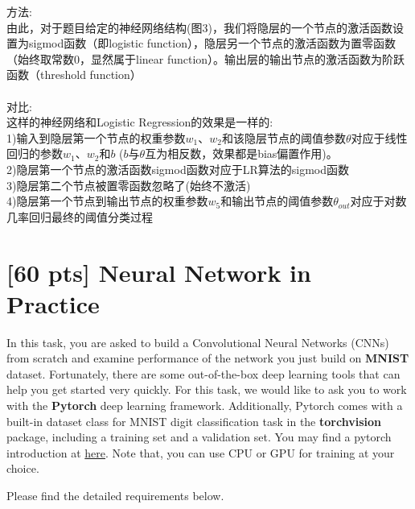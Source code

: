 \documentclass{article}
\begin{document}
	方法:\\由此，对于题目给定的神经网络结构(图3)，我们将隐层的一个节点的激活函数设置为sigmod函数（即logistic function），隐层另一个节点的激活函数为置零函数（始终取常数0，显然属于linear function）。输出层的输出节点的激活函数为阶跃函数（threshold function）\\\\
	对比:\\这样的神经网络和Logistic Regression的效果是一样的:\\
	1)输入到隐层第一个节点的权重参数$w_1$、$w_2$和该隐层节点的阈值参数$\theta$对应于线性回归的参数$w_1$、$w_2$和$b$ ($b$与$\theta$互为相反数，效果都是bias偏置作用)。\\
	2)隐层第一个节点的激活函数sigmod函数对应于LR算法的sigmod函数\\
	3)隐层第二个节点被置零函数忽略了(始终不激活)\\
	4)隐层第一个节点到输出节点的权重参数$w_5$和输出节点的阈值参数$\theta_{out}$对应于对数几率回归最终的阈值分类过程
	\\
	\section{[60 pts] Neural Network in Practice}
	
	In this task, you are asked to build a Convolutional Neural Networks (CNNs) from scratch and examine performance of the network you just build on \textbf{MNIST} dataset.
	Fortunately, there are some out-of-the-box deep learning tools that can help you get started very quickly. For this task, we would like to ask you to work with the \textbf{Pytorch} deep learning framework. Additionally, Pytorch comes with a built-in dataset class for MNIST digit classification task in the \textbf{torchvision} package, including a training set and a validation set. You may find a pytorch introduction at \href{https://pytorch.org/tutorials/beginner/blitz/cifar10_tutorial.html}{here}. Note that, you can use CPU or GPU for training at your choice.
	
	Please find the detailed requirements below.
	
\end{document}
